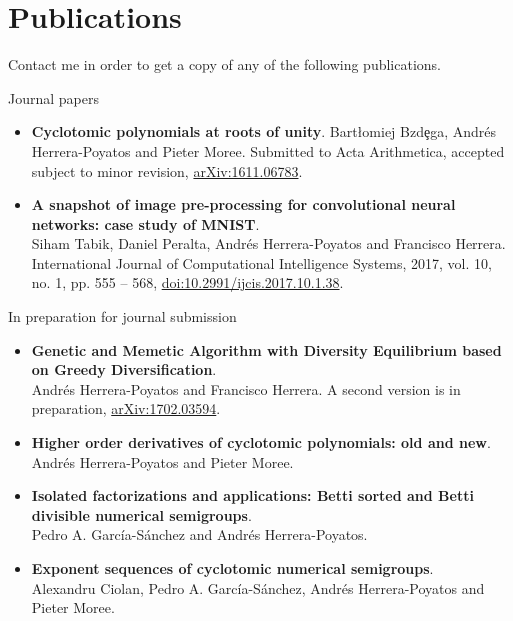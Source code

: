 \documentclass[10pt,a4paper,sans]{moderncv} %
\begin{document}

\section{Publications}

Contact me in order to get a copy of any of the following publications.

{\large \textcolor{color1}{Journal papers}}

	\begin{itemize}
        \item \textbf{Cyclotomic polynomials at roots of unity}. Bart{\l}omiej Bzd\c{e}ga, Andrés Herrera-Poyatos and Pieter Moree. %
              Submitted to Acta Arithmetica, accepted subject to minor revision, \textcolor{colorl}{\href{https://arxiv.org/abs/1611.06783}{arXiv:1611.06783}}.
	\item \textbf{A snapshot of image pre-processing for convolutional neural networks: case study of MNIST}. \\ Siham Tabik, Daniel Peralta, Andrés Herrera-Poyatos and Francisco Herrera. International Journal of Computational Intelligence Systems, 2017, vol. 10, no. 1, pp. 555 -- 568, \textcolor{colorl}{\href{http://www.atlantis-press.com/journals/ijcis/25867315}{doi:10.2991/ijcis.2017.10.1.38}}.
	\end{itemize}
                          
{\large \textcolor{color1}{In preparation for journal submission}}

	\begin{itemize}
		\item \textbf{Genetic and Memetic Algorithm with Diversity Equilibrium based on Greedy Diversification}. \\ Andr\'es Herrera-Poyatos and Francisco Herrera.
          	A second version is in preparation, \textcolor{colorl}{\href{https://arxiv.org/abs/1702.03594}{arXiv:1702.03594}}.
		\item \textbf{Higher order derivatives of cyclotomic polynomials: old and new}. Andr\'es Herrera-Poyatos and Pieter Moree. %
		\item \textbf{Isolated factorizations and applications: Betti sorted and Betti divisible numerical semigroups}. \\ Pedro A. Garc\'ia-S\'anchez and Andr\'es Herrera-Poyatos. %
		\item \textbf{Exponent sequences of cyclotomic numerical semigroups}.\\ Alexandru Ciolan, Pedro A. Garc\'ia-S\'anchez, Andr\'es Herrera-Poyatos and Pieter Moree. %
		\end{itemize}
\end{document}
